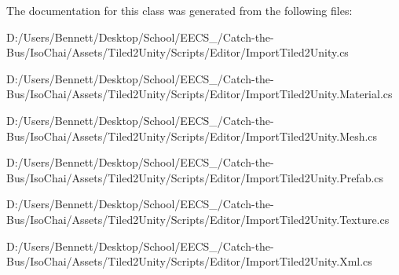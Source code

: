 The documentation for this class was generated from the following files\+:\begin{DoxyCompactItemize}
\item 
D\+:/\+Users/\+Bennett/\+Desktop/\+School/\+E\+E\+C\+S\+\_/\+Catch-\/the-\/\+Bus/\+Iso\+Chai/\+Assets/\+Tiled2\+Unity/\+Scripts/\+Editor/Import\+Tiled2\+Unity.\+cs\item 
D\+:/\+Users/\+Bennett/\+Desktop/\+School/\+E\+E\+C\+S\+\_/\+Catch-\/the-\/\+Bus/\+Iso\+Chai/\+Assets/\+Tiled2\+Unity/\+Scripts/\+Editor/Import\+Tiled2\+Unity.\+Material.\+cs\item 
D\+:/\+Users/\+Bennett/\+Desktop/\+School/\+E\+E\+C\+S\+\_/\+Catch-\/the-\/\+Bus/\+Iso\+Chai/\+Assets/\+Tiled2\+Unity/\+Scripts/\+Editor/Import\+Tiled2\+Unity.\+Mesh.\+cs\item 
D\+:/\+Users/\+Bennett/\+Desktop/\+School/\+E\+E\+C\+S\+\_/\+Catch-\/the-\/\+Bus/\+Iso\+Chai/\+Assets/\+Tiled2\+Unity/\+Scripts/\+Editor/Import\+Tiled2\+Unity.\+Prefab.\+cs\item 
D\+:/\+Users/\+Bennett/\+Desktop/\+School/\+E\+E\+C\+S\+\_/\+Catch-\/the-\/\+Bus/\+Iso\+Chai/\+Assets/\+Tiled2\+Unity/\+Scripts/\+Editor/Import\+Tiled2\+Unity.\+Texture.\+cs\item 
D\+:/\+Users/\+Bennett/\+Desktop/\+School/\+E\+E\+C\+S\+\_/\+Catch-\/the-\/\+Bus/\+Iso\+Chai/\+Assets/\+Tiled2\+Unity/\+Scripts/\+Editor/Import\+Tiled2\+Unity.\+Xml.\+cs\end{DoxyCompactItemize}
